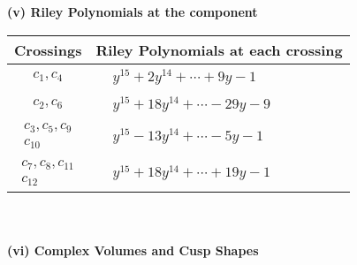 \documentclass[1p]{elsarticle_modified}
\theoremstyle{definition}
\begin{document}
\newpage\renewcommand{\arraystretch}{1}
\flushleft \textbf{(v) Riley Polynomials at the component}\newline \\
\begin{tabular}{m{50pt}|m{274pt}}
Crossings & \hspace{64pt}Riley Polynomials at each crossing \\
\hline $$\begin{aligned}c_{1},c_{4}\end{aligned}$$&$\begin{aligned}
&y^{15}+2 y^{14}+\cdots+9 y-1
\end{aligned}$\\
\hline $$\begin{aligned}c_{2},c_{6}\end{aligned}$$&$\begin{aligned}
&y^{15}+18 y^{14}+\cdots-29 y-9
\end{aligned}$\\
\hline $$\begin{aligned}c_{3},c_{5},c_{9}\\c_{10}\end{aligned}$$&$\begin{aligned}
&y^{15}-13 y^{14}+\cdots-5 y-1
\end{aligned}$\\
\hline $$\begin{aligned}c_{7},c_{8},c_{11}\\c_{12}\end{aligned}$$&$\begin{aligned}
&y^{15}+18 y^{14}+\cdots+19 y-1
\end{aligned}$\\
\hline
\end{tabular}\\~\\
\newpage\flushleft \textbf{(vi) Complex Volumes and Cusp Shapes}
\end{document}
